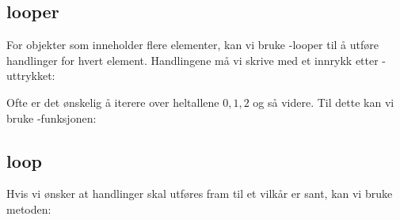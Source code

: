 \subsection*{ looper}
For objekter som inneholder flere elementer, kan vi bruke -looper til å utføre handlinger for hvert element. Handlingene må vi skrive med et innrykk etter -uttrykket:
\vsk

Ofte er det ønskelig å iterere over heltallene $ 0, 1, 2 $ og så videre. Til dette kan vi bruke -funksjonen:
\subsection*{ loop}
Hvis vi ønsker at handlinger skal utføres fram til et vilkår er sant, kan vi bruke  metoden:
\newpage



